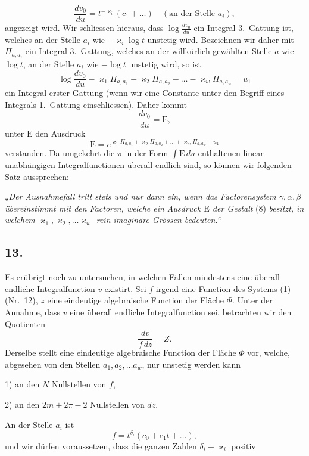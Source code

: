 \documentclass{article}
\begin{document}
\[
\frac{dv_0}{du} = t^{-\varkappa_i}(c_1 + \dots) \quad (\text{an der Stelle } a_i),
\]
angezeigt wird. Wir schliessen hieraus, dass $\log\frac{dv_0}{du}$ ein Integral 3.~Gattung ist, welches an der Stelle $a_i$ wie $-\varkappa_i\log t$ unstetig wird. Bezeichnen wir daher mit $\Pi_{a, a_i}$ ein Integral 3.~Gattung, welches an der willkürlich gewählten Stelle $a$ wie $\log t$, an der Stelle $a_i$ wie $-\log t$ unstetig wird, so ist
\[
\log\frac{dv_0}{du} - \varkappa_1 \Pi_{a, a_1} - \varkappa_2 \Pi_{a, a_2} - \dots - \varkappa_w \Pi_{a, a_w} = u_1
\]
ein Integral erster Gattung (wenn wir eine Constante unter den Begriff eines Integrals 1.~Gattung einschliessen). Daher kommt
\[
\frac{dv_0}{du} = \mathrm{E}, \tag{7}
\]
unter $\mathrm{E}$ den Ausdruck
\[
\mathrm{E} = e^{\varkappa_1 \Pi_{a, a_1} + \varkappa_2 \Pi_{a, a_2} + \dots + \varkappa_w \Pi_{a, a_w} + u_1} \tag{8}
\]
verstanden. Da umgekehrt die $\pi$ in der Form $\displaystyle\int \mathrm{E}\,du$ enthaltenen linear unabhängigen Integralfunctionen überall endlich sind, so können wir folgenden Satz aussprechen:

„\emph{Der Ausnahmefall tritt stets und nur dann ein, wenn das Factorensystem $\gamma, \alpha, \beta$ übereinstimmt mit den Factoren, welche ein Ausdruck $\mathrm{E}$ der Gestalt} (8) \emph{besitzt, in welchem $\varkappa_1, \varkappa_2, \dots \varkappa_w$ rein imaginäre Grössen bedeuten.“}

\subsection*{13.}

Es erübrigt noch zu untersuchen, in welchen Fällen mindestens eine überall endliche Integralfunction $v$ existirt. Sei $f$ irgend eine Function des Systems (1) (Nr.~12), $z$ eine eindeutige algebraische Function der Fläche $\Phi$. Unter der Annahme, dass $v$ eine überall endliche Integralfunction sei, betrachten wir den Quotienten
\[
\frac{dv}{f\,dz} = Z. \tag{1}
\]
Derselbe stellt eine eindeutige algebraische Function der Fläche $\Phi$ vor, welche, abgesehen von den Stellen $a_1, a_2, \dots a_w$, nur unstetig werden kann

1) an den $N$ Nullstellen von $f$,

2) an den $2m+2\pi-2$ Nullstellen von $dz$.

An der Stelle $a_i$ ist
\[
f = t^{\delta_i}(c_0 + c_1 t + \dots),
\]
und wir dürfen voraussetzen, dass die ganzen Zahlen $\delta_i + \varkappa_i$ positiv
\end{document}
